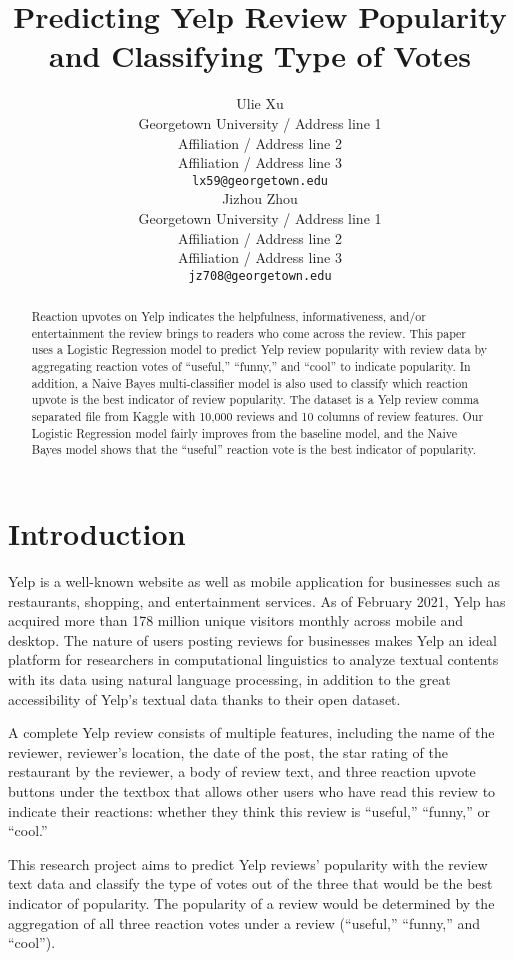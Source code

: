 \documentclass[11pt,a4paper]{article}
\title{Predicting Yelp Review Popularity and Classifying Type of Votes}
\author{Ulie Xu \\
  Georgetown University / Address line 1 \\
  Affiliation / Address line 2 \\
  Affiliation / Address line 3 \\
  \texttt{lx59@georgetown.edu} \\\And
  Jizhou Zhou \\
  Georgetown University / Address line 1 \\
  Affiliation / Address line 2 \\
  Affiliation / Address line 3 \\
  \texttt{jz708@georgetown.edu} \\}
\date{}
\begin{document}
\maketitle
\begin{abstract}
  Reaction upvotes on Yelp indicates the helpfulness, informativeness, and/or entertainment the review brings to readers who come across the review. This paper uses a Logistic Regression model to predict Yelp review popularity with review data by aggregating reaction votes of “useful,” “funny,” and “cool” to indicate popularity. In addition, a Naive Bayes multi-classifier model is also used to classify which reaction upvote is the best indicator of review popularity. The dataset is a Yelp review comma separated file from Kaggle with 10,000 reviews and 10 columns of review features. Our Logistic Regression model fairly improves from the baseline model, and the Naive Bayes model shows that the “useful” reaction vote is the best indicator of popularity.
\end{abstract}

\section{Introduction}

Yelp is a well-known website as well as mobile application for businesses such as restaurants, shopping, and entertainment services. As of February 2021, Yelp has acquired more than 178 million unique visitors monthly across mobile and desktop. The nature of users posting reviews for businesses makes Yelp an ideal platform for researchers in computational linguistics to analyze textual contents with its data using natural language processing, in addition to the great accessibility of Yelp’s textual data thanks to their open dataset.

A complete Yelp review consists of multiple features, including the name of the reviewer, reviewer’s location, the date of the post, the star rating of the restaurant by the reviewer, a body of review text, and three reaction upvote buttons under the textbox that allows other users who have read this review to indicate their reactions: whether they think this review is “useful,” “funny,” or “cool.” 

This research project aims to predict Yelp reviews’ popularity with the review text data and classify the type of votes out of the three that would be the best indicator of popularity. The popularity of a review would be determined by the aggregation of all three reaction votes under a review (“useful,” “funny,” and “cool”).
\end{document}
